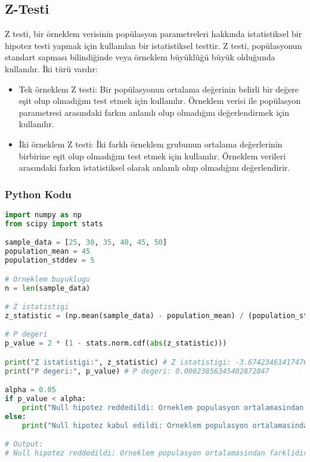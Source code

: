 \newpage

\subsection{Z-Testi}
Z testi, bir örneklem verisinin popülasyon parametreleri hakkında istatistiksel bir hipotez testi yapmak için kullanılan bir istatistiksel testtir. Z testi,  popülasyonun standart sapması bilindiğinde veya örneklem büyüklüğü büyük olduğunda kullanılır. İki türü vardır:

\begin{itemize}
    \item Tek örneklem Z testi: Bir popülasyonun ortalama değerinin belirli bir değere eşit olup olmadığını test etmek için kullanılır. Örneklem verisi ile popülasyon parametresi arasındaki farkın anlamlı olup olmadığını değerlendirmek için kullanılır.
    \item İki örneklem Z testi: İki farklı örneklem grubunun ortalama değerlerinin birbirine eşit olup olmadığını test etmek için kullanılır. Örneklem verileri arasındaki farkın istatistiksel olarak anlamlı olup olmadığını değerlendirir.
\end{itemize}

\subsubsection{Python Kodu}

\begin{lstlisting}[language=Python]
import numpy as np
from scipy import stats

sample_data = [25, 30, 35, 40, 45, 50]
population_mean = 45
population_stddev = 5

# Orneklem buyuklugu
n = len(sample_data)

# Z istatistigi
z_statistic = (np.mean(sample_data) - population_mean) / (population_stddev / np.sqrt(n))

# P degeri
p_value = 2 * (1 - stats.norm.cdf(abs(z_statistic)))

print("Z istatistigi:", z_statistic) # Z istatistigi: -3.674234614174767
print("P degeri:", p_value) # P degeri: 0.00023856345402872847

alpha = 0.05
if p_value < alpha:
    print("Null hipotez reddedildi: Orneklem populasyon ortalamasindan farklidir.")
else:
    print("Null hipotez kabul edildi: Orneklem populasyon ortalamasindan farkli degildir.")

# Output:
# Null hipotez reddedildi: Orneklem populasyon ortalamasindan farklidir.
\end{lstlisting}

